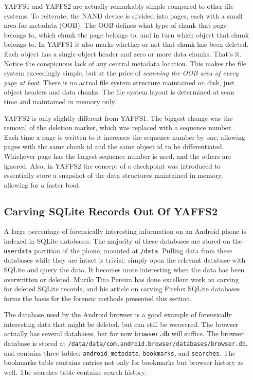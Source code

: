 YAFFS1 and YAFFS2 are actually remarkably simple compared to other file systems. To reiterate, the NAND device is divided into
pages, each with a small area for metadata (OOB).  The OOB defines what type of chunk that page belongs to, which chunk the page
belongs to, and in turn which object that chunk belongs to.  In YAFFS1 it also marks whether or not that chunk has been deleted.
Each object has a single object header and zero or more data chunks.  That's it.  Notice the conspicuous lack of any central
metadata location.  This makes the file system exceedingly simple, but at the price of \emph{scanning the OOB area of every page at
boot}.  There is no actual file system structure maintained on disk, just object headers and data chunks.  The file system layout is
determined at scan time and maintained in memory only. 

YAFFS2 is only slightly different from YAFFS1. The biggest change was the removal of the deletion marker, which was replaced with a
sequence number. Each time a page is written to it increases the sequence number by one, allowing pages with the same chunk id and
the same object id to be differentiated.  Whichever page has the largest sequence number is used, and the others are ignored.  Also,
in YAFFS2 the concept of a checkpoint was introduced to essentially store a snapshot of the data structures maintained in memory,
allowing for a faster boot.

\subsection{Carving SQLite Records Out Of YAFFS2} A large percentage of forensically interesting information on an Android phone is
indexed in SQLite databases.  The majority of these databases are stored on the \texttt{userdata} partition of the phone, mounted at
\texttt{/data}.  Pulling data from these databases while they are intact is trivial: simply open the relevant database with SQLite
and query the data.  It becomes more interesting when the data has been overwritten or deleted.  Murilo Tito Pereira has done
excellent work on carving for deleted SQLite records, and his article on carving Firefox SQLite databases forms the basis for the
forensic methods presented this section.  \cite{carvefirefox}

The database used by the Android browser is a good example of forensically interesting data that might be deleted, but can still be
recovered. The browser actually has several databases, but for now \texttt{browser.db} will suffice. The browser database is stored
at \texttt{/data/data/com.android.browser/databases/browser.db}, and contains three tables: \texttt{android\_metadata},
\texttt{bookmarks}, and \texttt{searches}.  The bookmarks table contains entries not only for bookmarks but browser history as well.
The searches table contains search history. 

